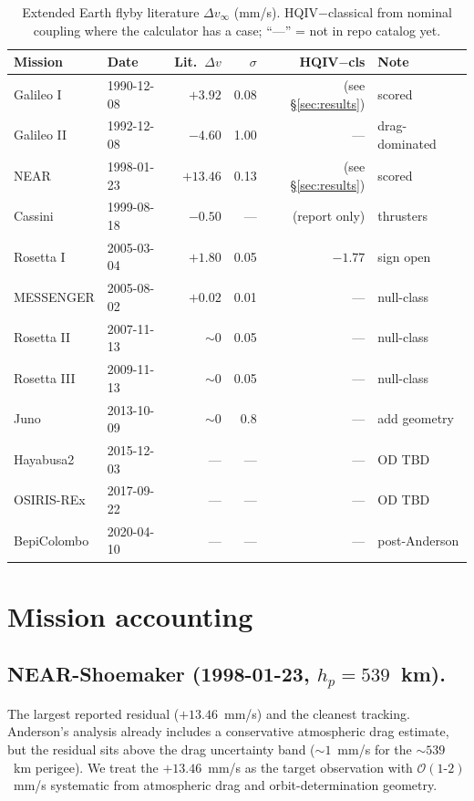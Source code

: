 \documentclass[11pt]{amsart}
\begin{document}
\begin{table}[t]
\centering
\caption{Extended Earth flyby literature $\Delta v_\infty$ (mm/s). HQIV$-$classical
from nominal coupling where the calculator has a case; ``---'' = not in repo catalog yet.}
\label{tab:extended-flybys}
\small
\begin{tabular}{@{}llrrrl@{}}
\toprule
Mission & Date & Lit.\ $\Delta v$ & $\sigma$ & HQIV$-$cls & Note \\
\midrule
Galileo I    & 1990-12-08 & $+3.92$  & 0.08 & (see \S\ref{sec:results}) & scored \\
Galileo II   & 1992-12-08 & $-4.60$  & 1.00 & --- & drag-dominated \\
NEAR         & 1998-01-23 & $+13.46$ & 0.13 & (see \S\ref{sec:results}) & scored \\
Cassini      & 1999-08-18 & $-0.50$  & ---  & (report only) & thrusters \\
Rosetta I    & 2005-03-04 & $+1.80$  & 0.05 & $-1.77$ & sign open \\
MESSENGER    & 2005-08-02 & $+0.02$  & 0.01 & --- & null-class \\
Rosetta II   & 2007-11-13 & $\sim 0$ & 0.05 & --- & null-class \\
Rosetta III  & 2009-11-13 & $\sim 0$ & 0.05 & --- & null-class \\
Juno         & 2013-10-09 & $\sim 0$ & 0.8  & --- & add geometry \\
Hayabusa2    & 2015-12-03 & ---      & ---  & --- & OD TBD \\
OSIRIS-REx   & 2017-09-22 & ---      & ---  & --- & OD TBD \\
BepiColombo  & 2020-04-10 & ---      & ---  & --- & post-Anderson \\
\bottomrule
\end{tabular}
\end{table}

\section{Mission accounting}\label{sec:missions}

\subsection*{NEAR-Shoemaker (1998-01-23, $h_p=539$~km).}
The largest reported residual ($+13.46$~mm/s) and the cleanest tracking. Anderson's analysis
already includes a conservative atmospheric drag estimate, but the residual sits above the
drag uncertainty band ($\sim 1$~mm/s for the $\sim 539$~km perigee). We treat the
$+13.46$~mm/s as the target observation with $\mathcal{O}(1\text{-}2)$~mm/s systematic from
atmospheric drag and orbit-determination geometry.
\end{document}
